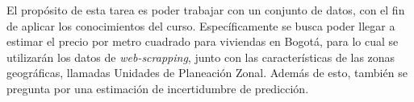 \documentclass[letterpaper,11pt,oneside]{article}
\begin{document}
	



\begin{resumen}
	El propósito de esta tarea es poder trabajar con un conjunto de datos, con el fin de aplicar los conocimientos del curso. Específicamente se busca poder llegar a estimar el precio por metro cuadrado para viviendas en Bogotá, para lo cual se utilizarán los datos de \textit{web-scrapping}, junto con las características de las zonas geográficas, llamadas Unidades de Planeación Zonal. Además de esto, también se pregunta por una estimación de incertidumbre de predicción.
\end{resumen}









\end{document}
